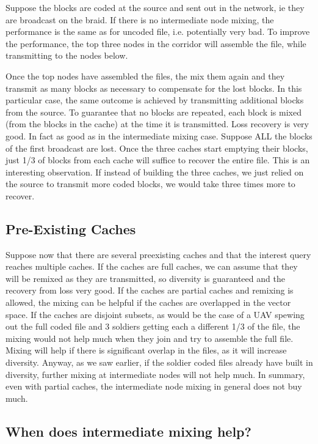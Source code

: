 Suppose the blocks are coded at the source and sent out in the network, ie they are broadcast on the braid. If there is no intermediate node mixing, the performance is the same as for uncoded file, i.e. potentially very bad. To improve the performance, the top three nodes in the corridor will assemble the file, while transmitting to the nodes below.

	 	 	
Once the top nodes have assembled the files, the mix them again and they transmit as many blocks as necessary to compensate for the lost blocks. In this particular case, the same outcome is achieved by transmitting additional blocks from the source. To guarantee that no blocks are repeated, each block is mixed (from the blocks in the cache) at the time it is transmitted. Loss recovery is very good. In fact as good as in the intermediate mixing case. Suppose ALL the blocks of the first broadcast are lost. Once the three caches start emptying their blocks, just 1/3 of blocks from each cache will suffice to recover the entire file. This is an interesting observation. If instead of building the three caches, we just relied on the source to transmit more coded blocks, we would take three times more to recover.


\subsection{Pre-Existing Caches}
	 	 	
Suppose now that there are several preexisting caches and that the interest query reaches multiple caches. If the caches are full caches, we can assume that they will be remixed as they are transmitted, so diversity is guaranteed and the recovery from loss very good. If the caches are partial caches and remixing is allowed, the mixing can be helpful if the caches are overlapped in the vector space. If the caches are disjoint subsets, as would be the case of a UAV spewing out the full coded file and 3 soldiers getting each a different 1/3 of the file, the mixing would not help much when they join and try to assemble the full file. Mixing will help if there is significant overlap in the files, as it will increase diversity. Anyway, as we saw earlier, if the soldier coded files already have built in diversity, further mixing at intermediate nodes will not help much. In summary, even with partial caches, the intermediate node mixing in general does not buy much.


\subsection{When does intermediate mixing help?}
	 	 	
